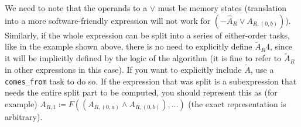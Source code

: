 \documentclass[12pt,letterpaper]{article}
\begin{document}
We need to note that the operands to a $\vee$ must be memory states (translation into a more software-friendly expression will not work for $(-\hat{A}_R \vee A_{R, (0, b)})$).
Similarly, if the whole expression can be split into a series of either-order tasks, like in the example shown above, there is no need to explicitly define $\widetilde{A}_R$4, since it will be implicitly defined by the logic of the algorithm (it is fine to refer to $\widetilde{A}_R$ in other expressions in this case).
If you want to explicitly include $\widetilde{A}$, use a \texttt{comes\_from} task to do so.
If the expression that was split is a subexpression that needs the entire split part to be computed, you should represent this as (for example) $A_{R, 1} \coloneqq F((A_{R, (0, a)} \wedge A_{R, (0, b)}), \ldots)$ (the exact representation is arbitrary).
\end{document}
